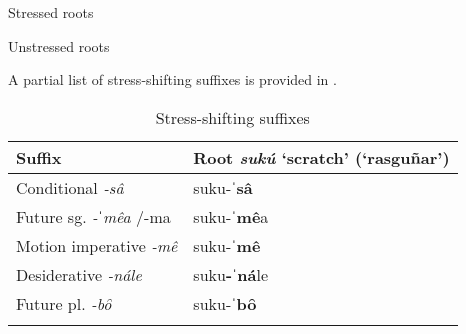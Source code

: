 
\TabPositions{2cm,3.5cm,6cm}
\ea\label{ex: stressed roots}
{Stressed roots}

    \z
\z


\ea\label{ex: unstressed roots}
{Unstressed roots}

    \z
\z

A partial list of stress-shifting suffixes is provided in .

\begin{table}
\caption{Stress-shifting suffixes}
\label{tab:key:8}

\begin{tabularx}{\textwidth}{Xl}
\lsptoprule
 \textbf{Suffix} & \textbf{Root \textit{sukú} }\textbf{‘scratch’ (‘rasguñar’)}\\
 \midrule
 Conditional \textit{-sâ} & suku-\textbf{ˈsâ}\\
 Future sg.  \textit{-ˈmêa} /-ma & suku-\textbf{ˈmê}a\\
 Motion imperative \textit{-mê} & suku-\textbf{ˈmê}\\
 Desiderative \textit{-nále} & suku\textbf{{}-ˈná}le\\
 Future pl. \textit{-bȏ} & suku-\textbf{ˈbȏ}\\

\lspbottomrule
\end{tabularx}
\end{table}

